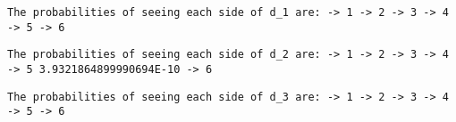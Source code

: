 \begin{flushleft}
\texttt{The probabilities of seeing each side of d\_1 are:
\newline {} -> 1
\newline {} -> 2
\newline {} -> 3
\newline {} -> 4
\newline {} -> 5
\newline {} -> 6
}
\end{flushleft}


\begin{flushleft}
\texttt{The probabilities of seeing each side of d\_2 are:
\newline {} -> 1
\newline {} -> 2
\newline {} -> 3
\newline {} -> 4
\newline {} -> 5
\newline \tab 3.9321864899990694E-10 -> 6
}
\end{flushleft}


\begin{flushleft}
\texttt{The probabilities of seeing each side of d\_3 are:
\newline {} -> 1
\newline {} -> 2
\newline {} -> 3
\newline {} -> 4
\newline {} -> 5
\newline {} -> 6
}
\end{flushleft}













